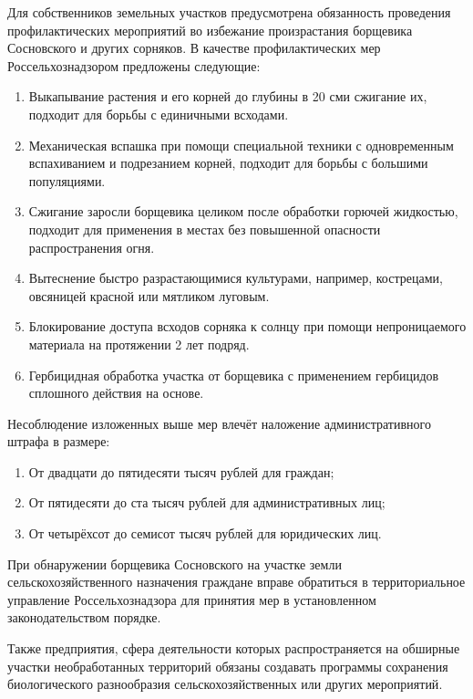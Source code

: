 \nwln
Для собственников земельных участков предусмотрена обязанность проведения профилактических мероприятий во избежание произрастания борщевика Сосновского и других сорняков\cite{rural-measures}.
В качестве профилактических мер Россельхознадзором\cite{countryside-measures} предложены следующие:
\begin{enumerate}[topsep=0pt, parsep=0pt, itemsep=0pt, wide=0.5cm]
	\item Выкапывание растения и его корней до глубины в 20 сми сжигание их, подходит для борьбы с единичными всходами.
	\item Механическая вспашка при помощи специальной техники с одновременным вспахиванием и подрезанием корней, подходит для борьбы с большими популяциями.
	\item Сжигание заросли борщевика целиком после обработки горючей жидкостью, подходит для применения в местах без повышенной опасности распространения огня.
	\item Вытеснение быстро разрастающимися культурами, например, кострецами, овсяницей красной или мятликом луговым.
	\item Блокирование доступа всходов сорняка к солнцу при помощи непроницаемого материала на протяжении 2 лет подряд.
	\item Гербицидная обработка участка от борщевика с применением гербицидов сплошного действия на основе.
\end{enumerate}

\nwln
Несоблюдение изложенных выше мер влечёт наложение административного штрафа\cite{rural-fine} в размере:
\begin{enumerate}[topsep=0pt, parsep=0pt, itemsep=0pt, wide=0.5cm]
	\item От двадцати до пятидесяти тысяч рублей для граждан;
	\item От пятидесяти до ста тысяч рублей для административных лиц;
	\item От четырёхсот до семисот тысяч рублей для юридических лиц.
\end{enumerate}

\nwln
При обнаружении борщевика Сосновского на участке земли сельскохозяйственного назначения\cite{rural-law} граждане вправе обратиться в территориальное управление Россельхознадзора для принятия мер в установленном законодательством порядке.

\nwln
Также предприятия, сфера деятельности которых распространяется на обширные участки необработанных территорий обязаны создавать программы сохранения биологического разнообразия сельскохозяйственных или других мероприятий\cite{nature-law}.

